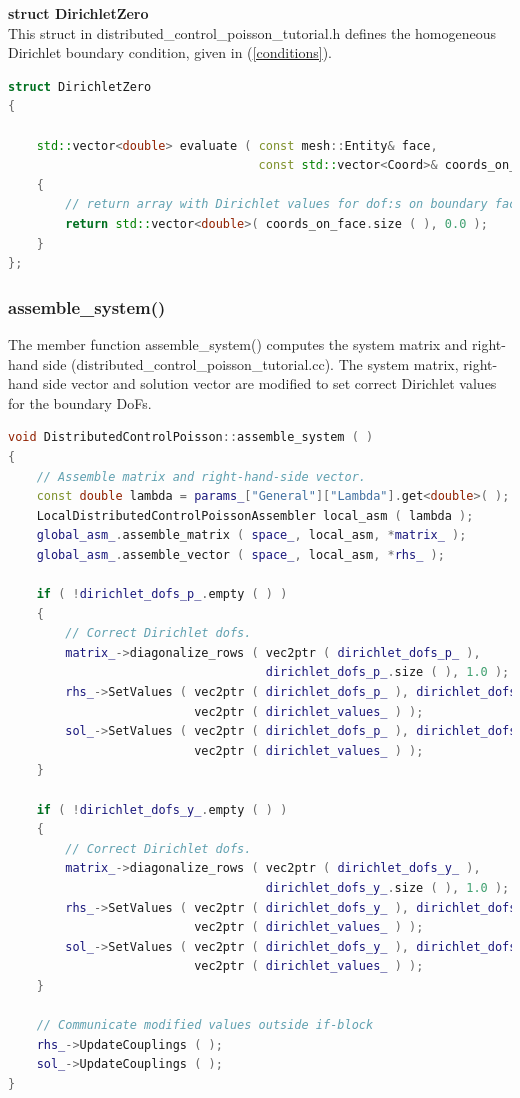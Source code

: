 \documentclass[a4paper, 11pt, twoside]{article}
\begin{document}
\textbf{struct DirichletZero} \label{structDirichletZero}\\
This struct in distributed\_control\_poisson\_tutorial.h defines the homogeneous Dirichlet boundary condition, given in (\ref{conditions}).
\begin{lstlisting}[language=C++, basicstyle={\footnotesize, \ttfamily}, keywordstyle=\color{blue}, numbers=none, tabsize=4]
struct DirichletZero
{

    std::vector<double> evaluate ( const mesh::Entity& face,
                                   const std::vector<Coord>& coords_on_face ) const
    {
        // return array with Dirichlet values for dof:s on boundary face
        return std::vector<double>( coords_on_face.size ( ), 0.0 );
    }
};
\end{lstlisting}

\subsubsection{assemble\_system()}
The member function assemble\_system() computes the system matrix and right-hand side (distributed\_control\_poisson\_tutorial.cc). The system matrix, right-hand side vector and solution vector are modified to set correct Dirichlet values for the boundary DoFs.

\begin{lstlisting}[language=C++, basicstyle={\footnotesize, \ttfamily}, keywordstyle=\color{blue}, numbers=none, tabsize=4]
void DistributedControlPoisson::assemble_system ( )
{
    // Assemble matrix and right-hand-side vector.
    const double lambda = params_["General"]["Lambda"].get<double>( );
    LocalDistributedControlPoissonAssembler local_asm ( lambda );
    global_asm_.assemble_matrix ( space_, local_asm, *matrix_ );
    global_asm_.assemble_vector ( space_, local_asm, *rhs_ );

    if ( !dirichlet_dofs_p_.empty ( ) )
    {
        // Correct Dirichlet dofs.
        matrix_->diagonalize_rows ( vec2ptr ( dirichlet_dofs_p_ ), 
                                    dirichlet_dofs_p_.size ( ), 1.0 );
        rhs_->SetValues ( vec2ptr ( dirichlet_dofs_p_ ), dirichlet_dofs_p_.size ( ),
                          vec2ptr ( dirichlet_values_ ) );
        sol_->SetValues ( vec2ptr ( dirichlet_dofs_p_ ), dirichlet_dofs_p_.size ( ),
                          vec2ptr ( dirichlet_values_ ) );
    }

    if ( !dirichlet_dofs_y_.empty ( ) )
    {
        // Correct Dirichlet dofs.
        matrix_->diagonalize_rows ( vec2ptr ( dirichlet_dofs_y_ ), 
                                    dirichlet_dofs_y_.size ( ), 1.0 );
        rhs_->SetValues ( vec2ptr ( dirichlet_dofs_y_ ), dirichlet_dofs_y_.size ( ),
                          vec2ptr ( dirichlet_values_ ) );
        sol_->SetValues ( vec2ptr ( dirichlet_dofs_y_ ), dirichlet_dofs_y_.size ( ),
                          vec2ptr ( dirichlet_values_ ) );
    }

    // Communicate modified values outside if-block
    rhs_->UpdateCouplings ( );
    sol_->UpdateCouplings ( );
}
\end{lstlisting} 
\end{document}
